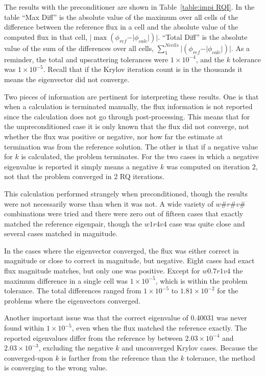 %
The results with the preconditioner are shown in Table~\ref{table:impi RQI}. In the table ``Max Diff'' is the absolute value of the maximum over all cells of the difference between the reference flux in a cell and the absolute value of the computed flux in that cell, $\vert\max(\phi_{ref} - \vert\phi_{calc}\vert)\vert$. ``Total Diff'' is the absolute value of the sum of the differences over all cells, $\sum_{1}^{Ncells}\vert(\phi_{ref} - \vert\phi_{calc}\vert)\vert$. As a reminder, the total and upscattering tolerances were $1 \times 10^{-4}$, and the $k$ tolerance was $1 \times 10^{-5}$. Recall that if the Krylov iteration count is in the thousands it means the eigenvector did not converge.

Two pieces of information are pertinent for interpreting these results. One is that when a calculation is terminated manually, the flux information is not reported since the calculation does not go through post-processing. This means that for the unpreconditioned case it is only known that the flux did not converge, not whether the flux was positive or negative, nor how far the estimate at termination was from the reference solution. The other is that if a negative value for $k$ is calculated, the problem terminates. For the two cases in which a negative eigenvalue is reported it simply means a negative $k$ was computed on iteration 2, not that the problem converged in 2 RQ iterations. 

This calculation performed strangely when preconditioned, though the results were not necessarily worse than when it was not. A wide variety of $w\#r\#v\#$ combinations were tried and there were zero out of fifteen cases that exactly matched the reference eigenpair, though the $w1r4v4$ case was quite close and several cases matched in magnitude. 

In the cases where the eigenvector converged, the flux was either correct in magnitude or close to correct in magnitude, but negative. Eight cases had exact flux magnitude matches, but only one was positive. Except for $w0.7r1v4$ the maximum difference in a single cell was $1 \times 10^{-5}$, which is within the problem tolerance. The total differences ranged from $1 \times 10^{-5}$ to $1.81 \times 10^{-2}$ for the problems where the eigenvectors converged. 

Another important issue was that the correct eigenvalue of 0.40031 was never found within $1 \times 10^{-5}$, even when the flux matched the reference exactly. The reported eigenvalues differ from the reference by between $2.03 \times 10^{-4}$ and $2.03 \times 10^{-3}$, excluding the negative $k$ and unconverged Krylov cases. Because the converged-upon $k$ is farther from the reference than the $k$ tolerance, the method is converging to the wrong value. 

